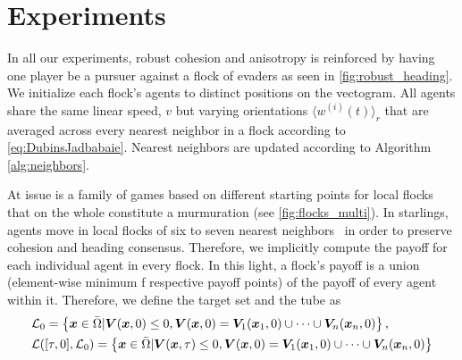 \section{Experiments}
\label{sec:expts}
%
In all our experiments, robust cohesion and anisotropy is reinforced by having one player be a pursuer against a flock of evaders as seen in \autoref{fig:robust_heading}. We initialize each flock's agents to distinct positions on the vectogram. All agents share the same linear speed, $v$ but varying orientations $\langle w^{(i)} (t) \rangle_r$ that are averaged across every nearest neighbor in a flock according to \eqref{eq:DubinsJadbabaie}. Nearest neighbors are updated according to Algorithm \ref{alg:neighbors}.
%

%
At issue is a family of games based on different starting points for local flocks that on the whole constitute a murmuration (see \autoref{fig:flocks_multi}). 
In starlings, agents move in local flocks of six to seven nearest neighbors~\cite{Ballerini1232} in order to preserve cohesion and heading consensus.  Therefore, we implicitly compute the payoff for each individual agent in every flock. In this light, a flock's payoff is a union (element-wise minimum f respective payoff points) of the payoff of every agent within it.  %
%
Therefore, we define the target set and the tube as
%
\begin{align}
	&\mathcal{L}_0 = \left\{ \bm{x} \in \bar{\Omega} | \bm{V}(\bm{x}, 0) \le 0, \bm{V}(\bm{x}, 0) = \bm{V}_1(\bm{x}_1, 0) \cup \cdots \cup \bm{V}_n(\bm{x}_n, 0)\right\} , \\
	&\mathcal{L}([\tau, 0],  \mathcal{L}_0) = \left\{\bm{x}\in \bar{\Omega}  | \bm{V}(\bm{x}, \tau) \le 0, \bm{V}(\bm{x}, 0) = \bm{V}_1(\bm{x}_1, 0) \cup \cdots \cup \bm{V}_n(\bm{x}_n, 0)\right\} \nonumber
\end{align}
